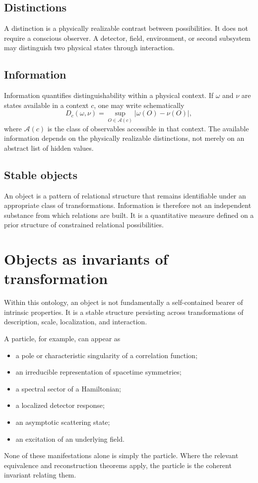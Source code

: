\documentclass[11pt]{article}
\newcommand{\cA}{\mathcal{A}}
\begin{document}
\subsection{Distinctions}

A distinction is a physically realizable contrast between possibilities.  It
does not require a conscious observer.  A detector, field, environment, or
second subsystem may distinguish two physical states through interaction.

\subsection{Information}

Information quantifies distinguishability within a physical context.  If
$\omega$ and $\nu$ are states available in a context $c$, one may write
schematically
\begin{equation}
  D_c(\omega,\nu)
  =
  \sup_{O\in\cA(c)}
  \left|\omega(O)-\nu(O)\right|,
  \label{eq:distinguishability}
\end{equation}
where $\cA(c)$ is the class of observables accessible in that context.  The
available information depends on the physically realizable distinctions, not
merely on an abstract list of hidden values.

\subsection{Stable objects}

An object is a pattern of relational structure that remains identifiable under
an appropriate class of transformations.  Information is therefore not an
independent substance from which relations are built.  It is a quantitative
measure defined on a prior structure of constrained relational possibilities.

\section{Objects as invariants of transformation}

Within this ontology, an object is not fundamentally a self-contained bearer of
intrinsic properties.  It is a stable structure persisting across transformations
of description, scale, localization, and interaction.

A particle, for example, can appear as
\begin{itemize}[leftmargin=2em]
  \item a pole or characteristic singularity of a correlation function;
  \item an irreducible representation of spacetime symmetries;
  \item a spectral sector of a Hamiltonian;
  \item a localized detector response;
  \item an asymptotic scattering state;
  \item an excitation of an underlying field.
\end{itemize}
None of these manifestations alone is simply the particle.  Where the relevant
equivalence and reconstruction theorems apply, the particle is the coherent
invariant relating them.
\end{document}
